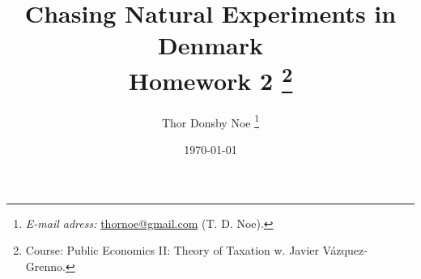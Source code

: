 \titlehead{ \centering\texttt{[image: 03\_figures/logo]}}

\title{\Huge Chasing Natural Experiments in Denmark %
\\ \huge Homework 2 %
\thanks{Course: Public Economics II: Theory of Taxation w. Javier Vázquez-Grenno.
}
}

\author[a]{Thor Donsby Noe
\thanks{ %
\textit{E-mail adress:} \href{mailto:thornoe@gmail.com}{thornoe@gmail.com} (T. D. Noe).}
}

\date{\normalsize \today %
  }

%         
